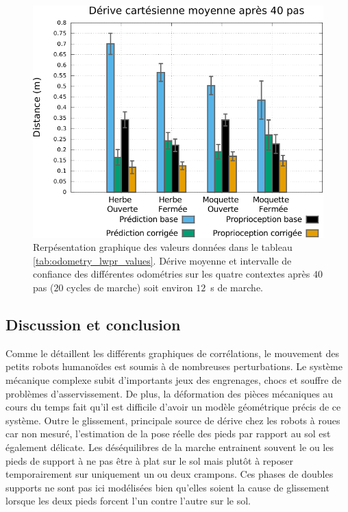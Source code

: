 \begin{figure}[htb!]
    \centerfloat
    \includegraphics[type=pdf,ext=.pdf,read=.pdf,width=0.7\linewidth]{../plot/OdometryLWPR/comparison_values}
    \caption{\label{fig:odometry_lwpr_values_bar} 
        Rerpésentation graphique des valeurs données dans le tableau \ref{tab:odometry_lwpr_values}.
        Dérive moyenne et intervalle de confiance des différentes odométries sur 
        les quatre contextes après $40$ pas ($20$ cycles de marche)
        soit environ $12$~s de marche.
    }
\end{figure}

\subsection{Discussion et conclusion\label{sec:odometry_lwpr_limits_and_conclusions}}

Comme le détaillent les différents graphiques de corrélations, le mouvement 
des petits robots humanoïdes est soumis à de nombreuses perturbations.
Le système mécanique complexe subit d'importants jeux des engrenages, 
chocs et souffre de problèmes d'asservissement.
De plus, la déformation des pièces mécaniques au cours du temps fait qu'il
est difficile d'avoir un modèle géométrique précis de ce système.
Outre le glissement, principale source de dérive chez les robots à roues 
car non mesuré, l'estimation de la pose réelle des pieds par rapport au sol
est également délicate.
Les déséquilibres de la marche entrainent souvent le ou les pieds de support
à ne pas être à plat sur le sol mais plutôt à reposer temporairement 
sur uniquement un ou deux crampons.
Ces phases de doubles supports ne sont pas ici modélisées bien qu'elles
soient la cause de glissement lorsque les deux pieds forcent 
l'un contre l'autre sur le sol.


